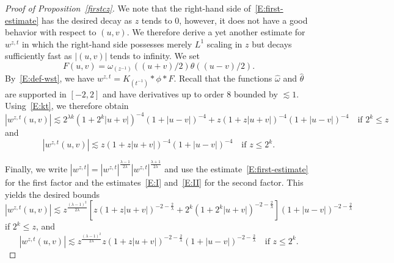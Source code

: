 \documentclass[12pt,reqno]{amsart}
\theoremstyle{plain}
\theoremstyle{definition}
\numberwithin{equation}{section}
\def\wh{\widehat}
\begin{document}
\begin{proof}[Proof of Proposition~\ref{firstcz}]
We note that the right-hand side of~\eqref{E:first-estimate} has the desired decay as $z$ tends to $0$, however, it does not have a good behavior with respect to $(u,v)$. We therefore derive a yet another estimate for $w^{z,t}$ in which the right-hand side possesses merely $L^1$ scaling in $z$ but decays sufficiently fast as $|(u,v)|$ tends to infinity. We set 
\[
F(u,v)=\omega_{(z^{-1})}((u+v)/2) \theta((u-v)/2).
\]
By~\eqref{E:def-wst}, we have
$w^{z,t}=K_{(t^{-1})} \ast \phi \ast F$. 
Recall that the functions $\wh{\omega}$ and $\wh{\theta}$ are supported in $[-2,2]$ and have derivatives up to order $8$ bounded by $\lesssim 1$. 
Using~\eqref{E:kt}, we therefore obtain
\begin{equation}\label{E:I}
|w^{z,t}(u,v)| \lesssim 2^{\lambda k}(1+2^k|u+v|)^{-4} (1+|u-v|)^{-4}
+z(1+z|u+v|)^{-4} (1+|u-v|)^{-4} \quad \text{if } 2^k \leq z
\end{equation}
and
\begin{equation}\label{E:II}
|w^{z,t}(u,v)| \lesssim z(1+z|u+v|)^{-4} (1+|u-v|)^{-4} \quad \text{if } z \leq 2^k.
\end{equation}

Finally, we write $|w^{z,t}|=|w^{z,t}|^{\frac{\lambda-1}{2\lambda}} |w^{z,t}|^{\frac{\lambda+1}{2\lambda}}$ and use the estimate~\eqref{E:first-estimate} for the first factor and the estimates~\eqref{E:I} and~\eqref{E:II} for the second factor. This yields the desired bounds
\begin{equation}\label{E:wzt-pointwise}
|w^{z,t}(u,v)| \lesssim z^{\frac{(\lambda-1)^2}{2\lambda}} [z(1+z|u+v|)^{-2-\frac{2}{\lambda}}+2^k(1+2^k|u+v|)^{-2-\frac{2}{\lambda}}] (1+|u-v|)^{-2-\frac{2}{\lambda}}  
\end{equation}
if  $2^k \leq z$, and
\begin{equation}\label{E:wzt-pointwise-2}
|w^{z,t}(u,v)| \lesssim z^{\frac{(\lambda-1)^2}{2\lambda}} z(1+z|u+v|)^{-2-\frac{2}{\lambda}} (1+|u-v|)^{-2-\frac{2}{\lambda}} \quad \text{if } z \leq 2^k.
\end{equation}


\end{proof}
\end{document}

